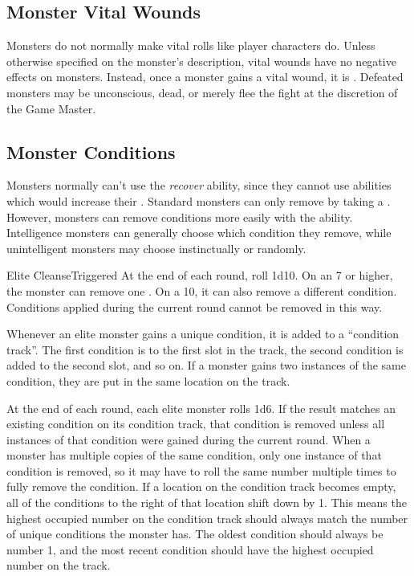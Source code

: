   \subsection{Monster Vital Wounds}
    Monsters do not normally make vital rolls like player characters do.
    Unless otherwise specified on the monster's description, vital wounds have no negative effects on monsters.
    Instead, once a monster gains a vital wound, it is .
    Defeated monsters may be unconscious, dead, or merely flee the fight at the discretion of the Game Master.

  \subsection{Monster Conditions}\label{Monster Conditions}
    Monsters normally can't use the \textit{recover} ability, since they cannot use abilities which would increase their .
    Standard monsters can only remove  by taking a .
    However,  monsters can remove conditions more easily with the  ability.
    Intelligence monsters can generally choose which condition they remove, while unintelligent monsters may choose instinctually or randomly.

    \begin{triggeredability}{Elite Cleanse}{Triggered}
      \rankline
      At the end of each round, roll 1d10.
      On an 7 or higher, the monster can remove one .
      On a 10, it can also remove a different condition.
      Conditions applied during the current round cannot be removed in this way.
    \end{triggeredability}

    Whenever an elite monster gains a unique condition, it is added to a ``condition track''.
    The first condition is to the first slot in the track, the second condition is added to the second slot, and so on.
    If a monster gains two instances of the same condition, they are put in the same location on the track.

    At the end of each round, each elite monster rolls 1d6.
    If the result matches an existing condition on its condition track, that condition is removed unless all instances of that condition were gained during the current round.
    When a monster has multiple copies of the same condition, only one instance of that condition is removed, so it may have to roll the same number multiple times to fully remove the condition.
    If a location on the condition track becomes empty, all of the conditions to the right of that location shift down by 1.
    This means the highest occupied number on the condition track should always match the number of unique conditions the monster has.
    The oldest condition should always be number 1, and the most recent condition should have the highest occupied number on the track.

